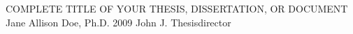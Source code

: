\documentclass{uathesis}
\begin{document}
{COMPLETE TITLE OF YOUR THESIS, DISSERTATION, OR DOCUMENT}	%
{Jane Allison Doe, Ph.D.}	%
{2009}						%
{John J. Thesisdirector}	%
\end{document}
